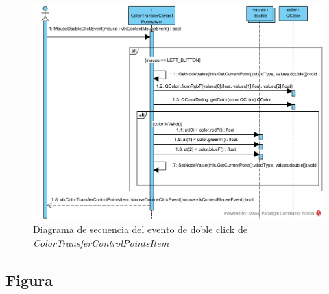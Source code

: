\begin{figure}[H]
	\centering
	\includegraphics[angle=90,width=12cm]{imagenes/diagramas/secuencia/ColorTransferControlPointsItem_MouseDoubleClickEvent}
	\caption{Diagrama de secuencia del evento de doble click de \textit{ColorTransferControlPointsItem}}
	\label{fig:diagrama_secuencia_colortransfercontrolpointsitem_mousedoubleclickevent}
\end{figure}

\subsection{Figura}

